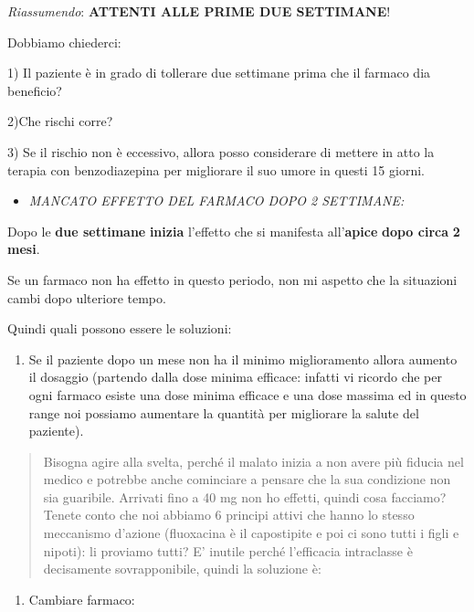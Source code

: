 \documentclass[]{article}
\begin{document}
\emph{Riassumendo}: \textbf{ATTENTI ALLE PRIME DUE SETTIMANE}!

Dobbiamo chiederci:

1) Il paziente è in grado di tollerare due settimane prima che il
farmaco dia beneficio?

2)Che rischi corre?

3) Se il rischio non è eccessivo, allora posso considerare di mettere in
atto la terapia con benzodiazepina per migliorare il suo umore in questi
15 giorni.

\begin{itemize}
\item
  \emph{MANCATO EFFETTO DEL FARMACO DOPO 2 SETTIMANE:}
\end{itemize}

Dopo le \textbf{due settimane} \textbf{inizia} l'effetto che si
manifesta all'\textbf{apice} \textbf{dopo circa} \textbf{2 mesi}.

Se un farmaco non ha effetto in questo periodo, non mi aspetto che la
situazioni cambi dopo ulteriore tempo.

Quindi quali possono essere le soluzioni:

\begin{enumerate}
\def\labelenumi{\arabic{enumi}.}
\item
  Se il paziente dopo un mese non ha il minimo miglioramento allora
  aumento il dosaggio (partendo dalla dose minima efficace: infatti vi
  ricordo che per ogni farmaco esiste una dose minima efficace e una
  dose massima ed in questo range noi possiamo aumentare la quantità per
  migliorare la salute del paziente).
\end{enumerate}

\begin{quote}
Bisogna agire alla svelta, perché il malato inizia a non avere più
fiducia nel medico e potrebbe anche cominciare a pensare che la sua
condizione non sia guaribile. Arrivati fino a 40 mg non ho effetti,
quindi cosa facciamo? Tenete conto che noi abbiamo 6 principi attivi che
hanno lo stesso meccanismo d'azione (fluoxacina è il capostipite e poi
ci sono tutti i figli e nipoti): li proviamo tutti? E' inutile perché
l'efficacia intraclasse è decisamente sovrapponibile, quindi la
soluzione è:
\end{quote}

\begin{enumerate}
\def\labelenumi{\arabic{enumi}.}
\item
  Cambiare farmaco:
\end{enumerate}
\end{document}
